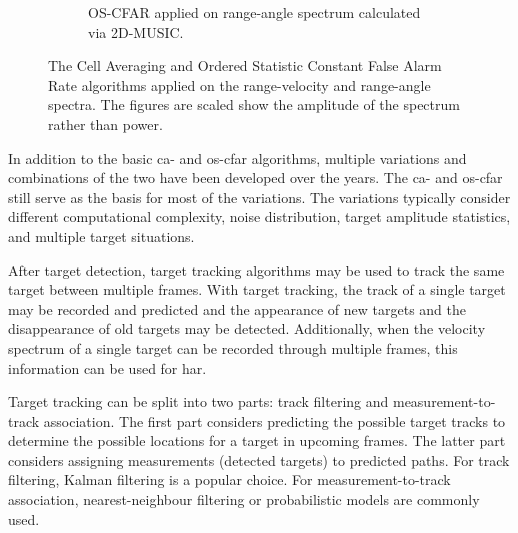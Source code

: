 \begin{figure}[H]
\begin{subfigure}{0.49\textwidth}
        \caption{OS-CFAR applied on range-angle spectrum calculated via 2D-MUSIC.}
        \label{fig:os-cfar-music}
    \end{subfigure}
    \caption{
        The Cell Averaging and Ordered Statistic Constant False Alarm Rate algorithms applied on the range-velocity and range-angle spectra.
        The figures are scaled show the amplitude of the spectrum rather than power.
    }
    \label{fig:cfar-plots}
\end{figure}

In addition to the basic \gls{ca}- and \gls{os}-\gls{cfar} algorithms, multiple variations and combinations of the two have been developed over the years.
The \gls{ca}- and \gls{os}-\gls{cfar} still serve as the basis for most of the variations.
The variations typically consider different computational complexity, noise distribution,
target amplitude statistics, and multiple target situations.~\cite{nato-radar-topics}

After target detection, target tracking algorithms may be used to track the same target between multiple frames.
With target tracking, the track of a single target may be recorded and predicted
and the appearance of new targets and the disappearance of old targets may be detected.
Additionally, when the velocity spectrum of a single target can be recorded through multiple frames,
this information can be used for \gls{har}.

Target tracking can be split into two parts: track filtering and measurement-to-track association.
The first part considers predicting the possible target tracks to determine the possible locations for a target in upcoming frames.
The latter part considers assigning measurements (detected targets) to predicted paths.
For track filtering, Kalman filtering is a popular choice.
For measurement-to-track association, nearest-neighbour filtering or probabilistic models are commonly used.~\cite{modern-radar-1}

